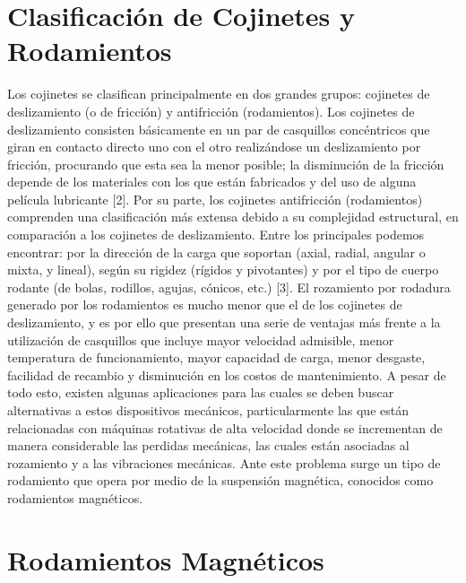 \section*{Clasificación de Cojinetes y Rodamientos}
\label{sec:intro:address}

Los cojinetes se clasifican principalmente en dos grandes grupos: cojinetes de deslizamiento (o de fricción) y antifricción (rodamientos). Los cojinetes de deslizamiento consisten básicamente en un par de casquillos concéntricos que giran en contacto directo uno con el otro realizándose un deslizamiento por fricción, procurando que esta sea la menor posible; la disminución de la fricción depende de los materiales con los que están fabricados y del uso de alguna película lubricante [2]. 
Por su parte, los cojinetes antifricción (rodamientos) comprenden una clasificación más extensa debido a su complejidad estructural, en comparación a los cojinetes de deslizamiento. Entre los principales podemos encontrar: por la dirección de la carga que soportan (axial, radial, angular o mixta, y lineal), según su rigidez (rígidos y pivotantes) y por el tipo de cuerpo rodante (de bolas, rodillos, agujas, cónicos, etc.) [3]. 
El rozamiento por rodadura generado por los rodamientos es mucho menor que el de los cojinetes de deslizamiento, y es por ello que presentan una serie de ventajas más frente a la utilización de casquillos que incluye mayor velocidad admisible, menor temperatura de funcionamiento, mayor capacidad de carga, menor desgaste, facilidad de recambio y disminución en los costos de mantenimiento. 
A pesar de todo esto, existen algunas aplicaciones para las cuales se deben buscar alternativas a estos dispositivos mecánicos, particularmente las que están relacionadas con máquinas rotativas de alta velocidad donde se incrementan de manera considerable las perdidas mecánicas, las cuales están asociadas al rozamiento y a las vibraciones mecánicas. Ante este problema surge un tipo de rodamiento que opera por medio de la suspensión magnética, conocidos como rodamientos magnéticos.  

\section*{Rodamientos Magnéticos}
\label{sec:intro:motivation}

